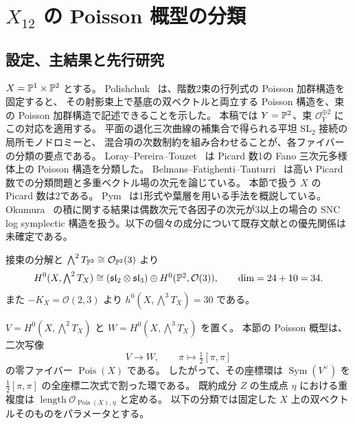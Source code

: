 \section{\texorpdfstring{$X_{12}$}{X12} の Poisson 概型の分類}
\label{p12:classification}
\subsection{設定、主結果と先行研究}
$X=\mathbb P^1\times\mathbb P^2$ とする。
Polishchuk~\cite[定理6.1, 式(16)]{Polishchuk1997} は、階数2束の行列式の Poisson 加群構造を固定すると、
その射影束上で基底の双ベクトルと両立する Poisson 構造を、束の Poisson 加群構造で記述できることを示した。
本稿では $Y=\mathbb P^2$、束 $\mathcal O_Y^{\oplus2}$ にこの対応を適用する。
平面の退化三次曲線の補集合で得られる平坦 $\mathrm{SL}_2$ 接続の局所モノドロミーと、
混合項の次数制約を組み合わせることが、各ファイバーの分類の要点である。
Loray--Pereira--Touzet~\cite[定理9.1]{p12-LPT} は Picard 数1の Fano 三次元多様体上の Poisson 構造を分類した。
Belmans--Fatighenti--Tanturri~\cite[\S2.2]{p12-BFT} は高い Picard 数での分類問題と多重ベクトル場の次元を論じている。
本節で扱う $X$ の Picard 数は2である。
Pym~\cite{p12-Pym} は1形式や葉層を用いる手法を概説している。
Okumura~\cite[定理1.2]{p12-Okumura} の積に関する結果は偶数次元で各因子の次元が3以上の場合の
SNC log symplectic 構造を扱う。以下の個々の成分について既存文献との優先関係は未確定である。

接束の分解と $\bigwedge^2T_{\mathbb P^2}\cong\mathcal O_{\mathbb P^2}(3)$ より
\[
 H^0(X,\textstyle\bigwedge^2T_X)
 \cong (\mathfrak{sl}_2\otimes\mathfrak{sl}_3)\oplus H^0(\mathbb P^2,\mathcal O(3)),
 \qquad \dim=24+10=34.
\]
また $-K_X=\mathcal O(2,3)$ より $h^0(X,\bigwedge^3T_X)=30$ である。

\begin{definition}\label{p12:def:scheme}
$V=H^0(X,\bigwedge^2T_X)$ と $W=H^0(X,\bigwedge^3T_X)$ を置く。
本節の Poisson 概型は、二次写像
\[
 V\longrightarrow W,\qquad \pi\longmapsto\tfrac12[\pi,\pi]
\]
の零ファイバー $\operatorname{Pois}(X)$ である。
したがって、その座標環は $\operatorname{Sym}(V^\vee)$ を
$\tfrac12[\pi,\pi]$ の全座標二次式で割った環である。
既約成分 $Z$ の生成点 $\eta$ における重複度は
$\operatorname{length}\mathcal O_{\operatorname{Pois}(X),\eta}$ と定める。
以下の分類では固定した $X$ 上の双ベクトルそのものをパラメータとする。
\end{definition}


